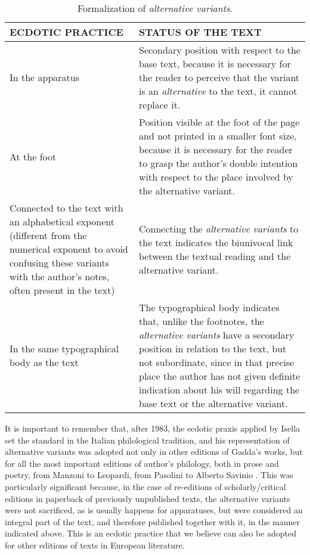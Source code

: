 \begin{paper}
\begin{table}[H]
\caption{Formalization of \textit{alternative variants}.}
\label{tab:italia:ecdotic}
\begin{tabular}{p{}|p{}}
\toprule
ECDOTIC PRACTICE & STATUS OF THE TEXT \\
\midrule
In the apparatus & Secondary position with respect to the base text,
because it is necessary for the reader to perceive that the variant is
an \emph{alternative} to the text, it cannot replace it. \\
\midrule
At the foot & Position visible at the foot of the page and not printed in a smaller font size, because
it is necessary for the reader to grasp the author's double intention
with respect to the place involved by the alternative variant. \\
\midrule
Connected to the text with an alphabetical exponent (different from the
numerical exponent to avoid confusing these variants with the author's
notes, often present in the text) & Connecting the \emph{alternative
variants} to the text indicates the biunivocal link between the textual
reading and the alternative variant. \\
\midrule
In the same typographical body as the text & The typographical body
indicates that, unlike the footnotes, the \emph{alternative variants}
have a secondary position in relation to the text, but not subordinate,
since in that precise place the author has not given definite indication
about his will regarding the base text or the alternative variant. \\
\bottomrule
\end{tabular}
\end{table}

It is important to remember that, after 1983, the ecdotic praxis applied
by Isella set the standard in the Italian philological tradition, and
his representation of alternative variants was adopted not only in other
editions of Gadda's works, but for all the most important editions of
author's philology, both in prose and poetry, from Manzoni to Leopardi,
from Pasolini to Alberto Savinio \parencite[57--59]{italia_what_2021}. This was
particularly significant because, in the case of re-editions of
scholarly/critical editions in paperback of previously unpublished
texts, the alternative variants were not sacrificed, as is usually
happens for apparatuses, but were considered an integral part of the
text, and therefore published together with it, in the manner indicated
above. This is an ecdotic practice that we believe can also be adopted for other
editions of texts in European literature.


\end{paper}
